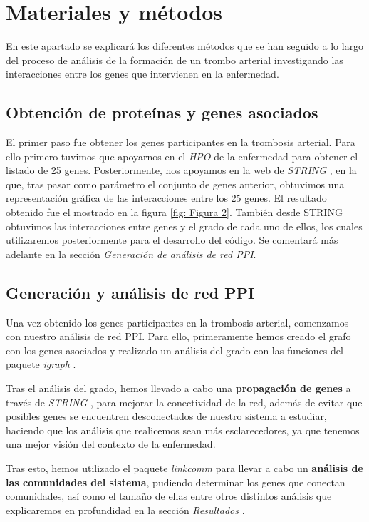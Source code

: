 \section{Materiales y métodos}

En este apartado se explicará los diferentes métodos que se han seguido a lo largo del proceso de análisis de la formación de un trombo arterial investigando las interacciones entre los genes que intervienen en la enfermedad.

\subsection{Obtención de proteínas y genes asociados}

El primer paso fue obtener los genes participantes en la trombosis arterial. Para ello primero tuvimos que apoyarnos en el \textit{HPO} de la enfermedad \cite{HPO} para obtener el listado de 25 genes. Posteriormente, nos apoyamos en la web de \textit{STRING} \cite{STRING} , en la que, tras pasar como parámetro el conjunto de genes anterior, obtuvimos una representación gráfica de las interacciones entre los 25 genes. El resultado obtenido fue el mostrado en la figura \ref{fig: Figura 2}. También desde STRING obtuvimos las interacciones entre genes y el grado de cada uno de ellos, los cuales utilizaremos posteriormente para el desarrollo del código. Se comentará más adelante en la sección \textit{Generación de análisis de red PPI}. \\



\subsection{Generación y análisis de red PPI}
Una vez obtenido los genes participantes en la trombosis arterial, comenzamos con nuestro análisis de red PPI. Para ello, primeramente hemos creado el grafo con los genes asociados y realizado un análisis del grado con las funciones del paquete \textit{igraph} \cite{igraph} . 

Tras el análisis del grado, hemos llevado a cabo una \textbf{propagación de genes} a través de \textit{STRING} \cite{STRING}, para mejorar la conectividad de la red, además de evitar que posibles genes se encuentren desconectados de nuestro sistema a estudiar, haciendo que los análisis que realicemos sean más esclarecedores, ya que tenemos una mejor visión del contexto de la enfermedad. 

Tras esto, hemos utilizado el paquete \textit{linkcomm} \cite{linkcomm} para llevar a cabo un \textbf{análisis de las comunidades del sistema}, pudiendo determinar los genes que conectan comunidades, así como el tamaño de ellas entre otros distintos análisis que explicaremos en profundidad en la sección \textit{Resultados} .

